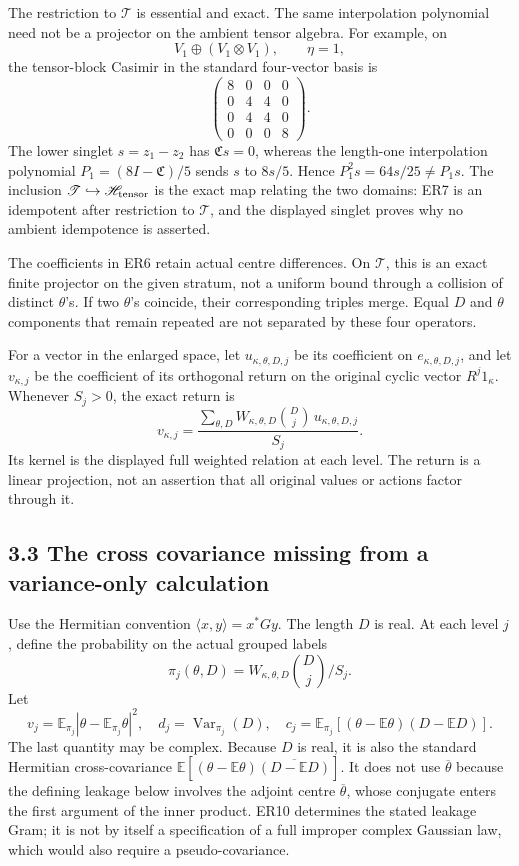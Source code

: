 \documentclass[
  11pt,
]{article}
\begin{document}
The restriction to \(\mathscr T\) is essential and exact. The same
interpolation polynomial need not be a projector on the ambient tensor
algebra. For example, on \[
V_1\oplus(V_1\otimes V_1),\qquad \eta=1,
\] the tensor-block Casimir in the standard four-vector basis is \[
\begin{pmatrix}
8&0&0&0\\
0&4&4&0\\
0&4&4&0\\
0&0&0&8
\end{pmatrix}.
\] The lower singlet \(s=z_1-z_2\) has \(\mathfrak C s=0\), whereas the
length-one interpolation polynomial \(P_1=(8I-\mathfrak C)/5\) sends
\(s\) to \(8s/5\). Hence \(P_1^2s=64s/25\ne P_1s\). The inclusion
\(\mathscr T\hookrightarrow\mathscr H_{\rm tensor}\) is the exact map
relating the two domains: ER7 is an idempotent after restriction to
\(\mathscr T\), and the displayed singlet proves why no ambient
idempotence is asserted.

The coefficients in ER6 retain actual centre differences. On
\(\mathscr T\), this is an exact finite projector on the given stratum,
not a uniform bound through a collision of distinct \(\theta\)'s. If two
\(\theta\)'s coincide, their corresponding triples merge. Equal \(D\)
and \(\theta\) components that remain repeated are not separated by
these four operators.

For a vector in the enlarged space, let \(u_{\kappa,\theta,D,j}\) be its
coefficient on \(e_{\kappa,\theta,D,j}\), and let \(v_{\kappa,j}\) be
the coefficient of its orthogonal return on the original cyclic vector
\(R^j1_\kappa\). Whenever \(S_j>0\), the exact return is \[
\boxed{v_{\kappa,j}
=\frac{\sum_{\theta,D}W_{\kappa,\theta,D}\binom Dj\,u_{\kappa,\theta,D,j}}{S_j}.}
\tag{ER8}
\] Its kernel is the displayed full weighted relation at each level. The
return is a linear projection, not an assertion that all original values
or actions factor through it.

\subsection{3.3 The cross covariance missing from a variance-only
calculation}\label{the-cross-covariance-missing-from-a-variance-only-calculation}

Use the Hermitian convention \(\langle x,y\rangle=x^*Gy\). The length
\(D\) is real. At each level \(j\), define the probability on the actual
grouped labels \[
\pi_j(\theta,D)=W_{\kappa,\theta,D}\binom Dj/S_j.
\] Let \[
v_j=\mathbb E_{\pi_j}|\theta-\mathbb E_{\pi_j}\theta|^2,
\quad d_j=\operatorname{Var}_{\pi_j}(D),
\quad c_j=\mathbb E_{\pi_j}[(\theta-\mathbb E\theta)(D-\mathbb ED)].
\tag{ER9}
\] The last quantity may be complex. Because \(D\) is real, it is also
the standard Hermitian cross-covariance
\(\mathbb E[(\theta-\mathbb E\theta)\overline{(D-\mathbb ED)}]\). It
does not use \(\overline\theta\) because the defining leakage below
involves the adjoint centre \(\overline\theta\), whose conjugate enters
the first argument of the inner product. ER10 determines the stated
leakage Gram; it is not by itself a specification of a full improper
complex Gaussian law, which would also require a pseudo-covariance.
\end{document}
